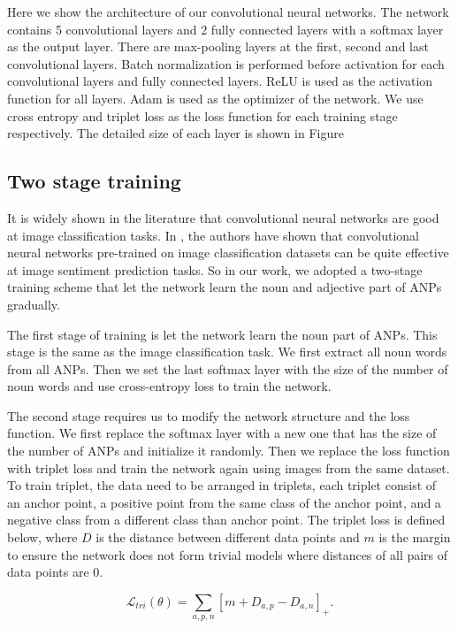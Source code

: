 Here we show the architecture of our convolutional neural networks. The network contains 5 convolutional layers and 2 fully connected layers with a softmax layer as the output layer. There are max-pooling layers at the first, second and last convolutional layers. Batch normalization is performed before activation for each convolutional layers and fully connected layers. ReLU is used as the activation function for all layers. Adam \cite{kingma2014adam} is used as the optimizer of the network. We use cross entropy and triplet loss as the loss function for each training stage respectively. The detailed size of each layer is shown in Figure \cite{fig:net_structure}

\subsection{Two stage training}
It is widely shown in the literature \cite{krizhevsky2012imagenet, szegedy2015going, simonyan2014very, he2016deep} that convolutional neural networks are good at image classification tasks. In \cite{campos2017pixels}, the authors have shown that convolutional neural networks pre-trained on image classification datasets can be quite effective at image sentiment prediction tasks. So in our work, we adopted a two-stage training scheme that let the network learn the noun and adjective part of ANPs gradually.

The first stage of training is let the network learn the noun part of ANPs. This stage is the same as the image classification task. We first extract all noun words from all ANPs. Then we set the last softmax layer with the size of the number of noun words and use cross-entropy loss to train the network.

The second stage requires us to modify the network structure and the loss function. We first replace the softmax layer with a new one that has the size of the number of ANPs and initialize it randomly. Then we replace the loss function with triplet loss and train the network again using images from the same dataset.
To train triplet, the data need to be arranged in triplets, each triplet consist of an anchor point, a positive point from the same class of the anchor point, and a negative class from a different class than anchor point. The triplet loss is defined below, where $D$ is the distance between different data points and $m$ is the margin to ensure the network does not form trivial models where distances of all pairs of data points are $0$.

\[
\mathcal{L}_{tri}(\theta) = \sum_{a,p,n} [m + D_{a,p} - D_{a,n}]_{+}.
\]

